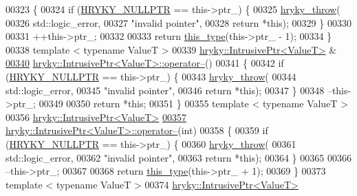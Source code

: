 \begin{DoxyCode}
00323 \{
00324     \textcolor{keywordflow}{if} (\hyperlink{common_8h_a4cd4ac09cfcdbd6b30ee69afc156e210}{HRYKY_NULLPTR} == this->ptr\_) \{
00325         \hyperlink{debug__common_8h_af50606eac4009921527ddcaed392b2c2}{hryky_throw}(
00326             std::logic\_error,
00327             \textcolor{stringliteral}{"invalid pointer"},
00328             \textcolor{keywordflow}{return} *\textcolor{keyword}{this});
00329     \}
00330 
00331     ++this->ptr\_;
00332 
00333     \textcolor{keywordflow}{return} \hyperlink{classhryky_1_1_intrusive_ptr}{this_type}(this->ptr\_ - 1);
00334 \}
00338 \textcolor{keyword}{template} < \textcolor{keyword}{typename} ValueT >
00339 \hyperlink{classhryky_1_1_intrusive_ptr}{hryky::IntrusivePtr<ValueT>} &
\hypertarget{intrusive__ptr_8h_source_l00340}{}\hyperlink{classhryky_1_1_intrusive_ptr_a87fa7ed8e3b31f421c164aaf3091efaf}{00340} \hyperlink{classhryky_1_1_intrusive_ptr}{hryky::IntrusivePtr<ValueT>::operator--}()
00341 \{
00342     \textcolor{keywordflow}{if} (\hyperlink{common_8h_a4cd4ac09cfcdbd6b30ee69afc156e210}{HRYKY_NULLPTR} == this->ptr\_) \{
00343         \hyperlink{debug__common_8h_af50606eac4009921527ddcaed392b2c2}{hryky_throw}(
00344             std::logic\_error,
00345             \textcolor{stringliteral}{"invalid pointer"},
00346             \textcolor{keywordflow}{return} *\textcolor{keyword}{this});
00347     \}
00348     --this->ptr\_;
00349     
00350     \textcolor{keywordflow}{return} *\textcolor{keyword}{this};
00351 \}
00355 \textcolor{keyword}{template} < \textcolor{keyword}{typename} ValueT >
00356 \hyperlink{classhryky_1_1_intrusive_ptr}{hryky::IntrusivePtr<ValueT>}
\hypertarget{intrusive__ptr_8h_source_l00357}{}\hyperlink{classhryky_1_1_intrusive_ptr_a9e99a7d62e21d24050d46d2213d38538}{00357} \hyperlink{classhryky_1_1_intrusive_ptr}{hryky::IntrusivePtr<ValueT>::operator--}(\textcolor{keywordtype}{int})
00358 \{
00359     \textcolor{keywordflow}{if} (\hyperlink{common_8h_a4cd4ac09cfcdbd6b30ee69afc156e210}{HRYKY_NULLPTR} == this->ptr\_) \{
00360         \hyperlink{debug__common_8h_af50606eac4009921527ddcaed392b2c2}{hryky_throw}(
00361             std::logic\_error,
00362             \textcolor{stringliteral}{"invalid pointer"},
00363             \textcolor{keywordflow}{return} *\textcolor{keyword}{this});
00364     \}
00365 
00366     --this->ptr\_;
00367 
00368     \textcolor{keywordflow}{return} \hyperlink{classhryky_1_1_intrusive_ptr}{this_type}(this->ptr\_ + 1);
00369 \}
00373 \textcolor{keyword}{template} < \textcolor{keyword}{typename} ValueT >
00374 \hyperlink{classhryky_1_1_intrusive_ptr}{hryky::IntrusivePtr<ValueT>}

\end{DoxyCode}

